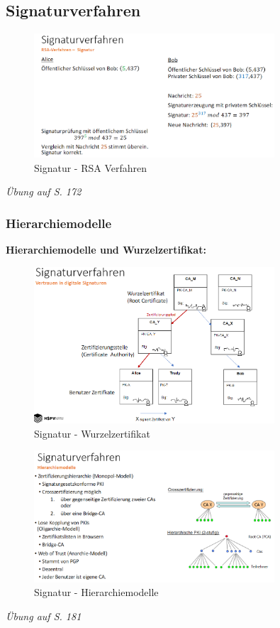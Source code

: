 \documentclass[a4paper,12pt]{article}
\begin{document}
\subsection{Signaturverfahren}
\begin{figure}[H]
    \centering
    \includegraphics[width=0.8\textwidth]{bilder/signaturRSA.png}
    \caption{Signatur - RSA Verfahren}
    \label{fig:signatur}
\end{figure}
\textit{Übung auf S. 172}

\subsubsection{Hierarchiemodelle}
\noindent\textbf{Hierarchiemodelle und Wurzelzertifikat:}\\
\vspace{1em}

\begin{figure}[H]
    \centering
    \includegraphics[width=0.8\textwidth]{bilder/wurzel.png}
    \caption{Signatur - Wurzelzertifikat}
    \label{fig:wurzel}
\end{figure}

\begin{figure}[H]
    \centering
    \includegraphics[width=0.8\textwidth]{bilder/hierarchiemodelle.png}
    \caption{Signatur - Hierarchiemodelle}
    \label{fig:Hierarchiemodelle}
\end{figure}
\textit{Übung auf S. 181}
\end{document}
